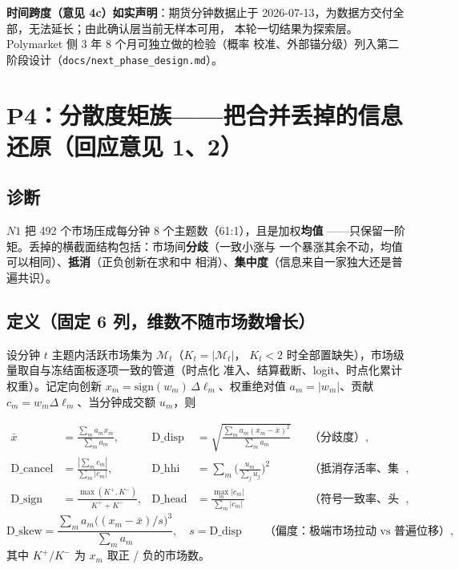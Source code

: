 \documentclass[11pt, a4paper]{ctexart}
\newcommand{\code}[1]{\texttt{\small #1}}
\begin{document}
\noindent\textbf{时间跨度（意见 4c）如实声明}：期货分钟数据止于
2026-07-13，为数据方交付全部，无法延长；由此确认层当前无样本可用，
本轮一切结果为探索层。Polymarket 侧 3 年 8 个月可独立做的检验（概率
校准、外部锚分级）列入第二阶段设计（\code{docs/next\_phase\_design.md}）。

\section{P4：分散度矩族——把合并丢掉的信息还原（回应意见 1、2）}\label{sec:p4}

\subsection{诊断}

$N1$ 把 492 个市场压成每分钟 8 个主题数（61:1），且是加权\textbf{均值}
——只保留一阶矩。丢掉的横截面结构包括：市场间\textbf{分歧}（一致小涨与
一个暴涨其余不动，均值可以相同）、\textbf{抵消}（正负创新在求和中
相消）、\textbf{集中度}（信息来自一家独大还是普遍共识）。

\subsection{定义（固定 6 列，维数不随市场数增长）}

设分钟 $t$ 主题内活跃市场集为 $\mathcal{M}_t$（$K_t=|\mathcal{M}_t|$，
$K_t<2$ 时全部置缺失），市场级量取自与冻结面板逐项一致的管道（时点化
准入、结算截断、logit、时点化累计权重）。记定向创新
$x_m=\mathrm{sign}(w_m)\,\Delta\ell_m$、权重绝对值 $a_m=|w_m|$、贡献
$c_m=w_m\Delta\ell_m$、当分钟成交额 $u_m$，则

\begin{align}
\bar x &= \frac{\sum_m a_m x_m}{\sum_m a_m},&
\text{D\_disp} &= \sqrt{\frac{\sum_m a_m (x_m-\bar x)^2}{\sum_m a_m}}
  &&\text{（分歧度）},\\
\text{D\_cancel} &= \frac{|\sum_m c_m|}{\sum_m |c_m|},&
\text{D\_hhi} &= \sum_m \Big(\frac{u_m}{\sum_j u_j}\Big)^2
  &&\text{（抵消存活率、集中度）},\\
\text{D\_sign} &= \frac{\max(K^+,K^-)}{K^++K^-},&
\text{D\_head} &= \frac{\max_m |c_m|}{\sum_m |c_m|}
  &&\text{（符号一致率、头部占比）},
\end{align}
\[
\text{D\_skew} = \frac{\sum_m a_m\big((x_m-\bar x)/s\big)^3}{\sum_m a_m},
\quad s=\text{D\_disp}
\qquad\text{（偏度：极端市场拉动 vs 普遍位移）},
\]
其中 $K^{+}/K^{-}$ 为 $x_m$ 取正 / 负的市场数。
\end{document}
